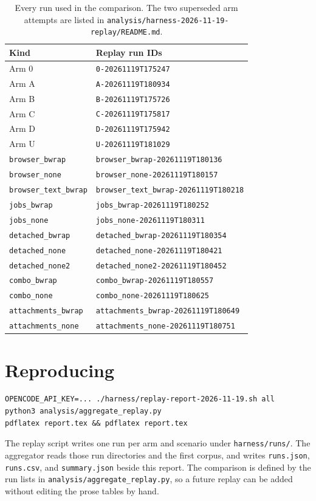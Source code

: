 \documentclass[11pt]{article}
\newcommand{\code}[1]{\texttt{#1}}
\begin{document}
\begin{table}[h]
\centering
\footnotesize
\begin{tabular}{@{}ll@{}}
\toprule
Kind & Replay run IDs \\
\midrule
Arm 0 & \code{0-20261119T175247} \\
Arm A & \code{A-20261119T180934} \\
Arm B & \code{B-20261119T175726} \\
Arm C & \code{C-20261119T175817} \\
Arm D & \code{D-20261119T175942} \\
Arm U & \code{U-20261119T181029} \\
\code{browser\_bwrap} & \code{browser\_bwrap-20261119T180136} \\
\code{browser\_none} & \code{browser\_none-20261119T180157} \\
\code{browser\_text\_bwrap} & \code{browser\_text\_bwrap-20261119T180218} \\
\code{jobs\_bwrap} & \code{jobs\_bwrap-20261119T180252} \\
\code{jobs\_none} & \code{jobs\_none-20261119T180311} \\
\code{detached\_bwrap} & \code{detached\_bwrap-20261119T180354} \\
\code{detached\_none} & \code{detached\_none-20261119T180421} \\
\code{detached\_none2} & \code{detached\_none2-20261119T180452} \\
\code{combo\_bwrap} & \code{combo\_bwrap-20261119T180557} \\
\code{combo\_none} & \code{combo\_none-20261119T180625} \\
\code{attachments\_bwrap} & \code{attachments\_bwrap-20261119T180649} \\
\code{attachments\_none} & \code{attachments\_none-20261119T180751} \\
\bottomrule
\end{tabular}
\caption{Every run used in the comparison. The two superseded arm attempts are
listed in \code{analysis/harness-2026-11-19-replay/README.md}.}
\end{table}

\section{Reproducing}

\begin{verbatim}
OPENCODE_API_KEY=... ./harness/replay-report-2026-11-19.sh all
python3 analysis/aggregate_replay.py
pdflatex report.tex && pdflatex report.tex
\end{verbatim}

The replay script writes one run per arm and scenario under
\code{harness/runs/}. The aggregator reads those run directories and the first
corpus, and writes \code{runs.json}, \code{runs.csv}, and \code{summary.json}
beside this report. The comparison is defined by the run lists in
\code{analysis/aggregate\_replay.py}, so a future replay can be added without
editing the prose tables by hand.
\end{document}
